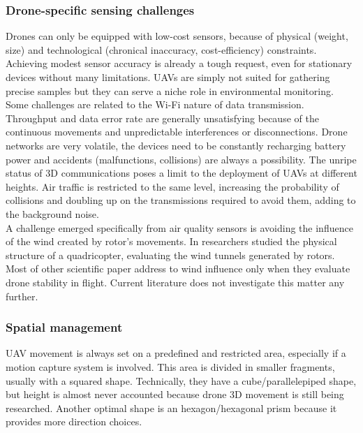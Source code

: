 \documentclass[journal]{IEEEtran}
\begin{document}
\subsubsection{Drone-specific sensing challenges}
Drones can only be equipped with low-cost sensors, because of physical (weight, size) and technological (chronical inaccuracy, cost-efficiency) constraints. Achieving modest sensor accuracy is already a tough request, even for stationary devices without many limitations. UAVs are simply not suited for gathering precise samples but they can serve a niche role in environmental monitoring.
\\
Some challenges are related to the Wi-Fi nature of data transmission. Throughput and data error rate are generally unsatisfying because of the continuous movements and unpredictable interferences or disconnections. Drone networks are very volatile, the devices need to be constantly recharging battery power and accidents (malfunctions, collisions) are always a possibility. The unripe status of 3D communications poses a limit to the deployment of UAVs at different heights. Air traffic is restricted to the same level, increasing the probability of collisions and doubling up on the transmissions required to avoid them, adding to the background noise.
\\
A challenge emerged specifically from air quality sensors is avoiding the influence of the wind created by rotor's movements. In \cite{airmeas} researchers studied the physical structure of a quadricopter, evaluating the wind tunnels generated by rotors. Most of other scientific paper address to wind influence only when they evaluate drone stability in flight. Current literature does not investigate this matter any further.

\subsubsection{Spatial management}
UAV movement is always set on a predefined and restricted area, especially if a motion capture system is involved. This area is divided in smaller fragments, usually with a squared shape. Technically, they have a cube/parallelepiped \cite{airwise} shape, but height is almost never accounted because drone 3D movement is still being researched. Another optimal shape is an hexagon/hexagonal prism \cite{swarmtrack} because it provides more direction choices.
\end{document}
